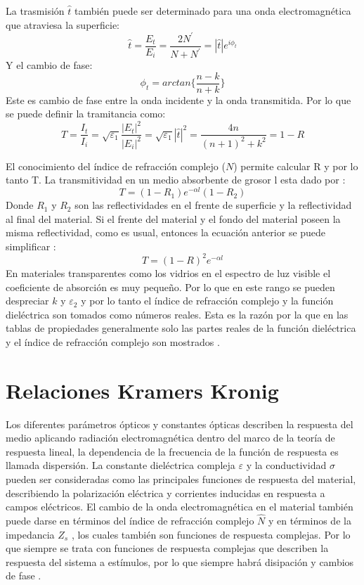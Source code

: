 \documentclass[a4paper,openright,12pt]{book}
\begin{document}
La trasmisión $\hat{t}$ también puede ser determinado para una onda electromagnética que atraviesa la  superficie:
\begin{equation}
\hat{t}=\frac{E_{t}}{E_{i}}=\frac{2N^{'}}{N+N^{'}}=|\hat{t}|e^{i\phi_{t}}
\end{equation}
Y el cambio de fase:
\begin{equation}
\phi_{t}=arctan\{\frac{n-k}{n+k}\}
\end{equation}
Este es cambio de fase entre la onda incidente y la onda transmitida. Por lo que se puede definir la tramitancia como:
\begin{equation}
T=\frac{I_{t}}{I_{i}}=\sqrt{\varepsilon_{1}}\frac{|E_{t}|^{2}}{|E_{i}|^{2}}=\sqrt{\varepsilon_{1}}|\hat{t}|^{2}=\frac{4n}{(n+1)^{2}+k^{2}}=1-R
\end{equation}


El conocimiento del índice de refracción complejo ($N$) permite calcular R y por lo tanto T. La transmitividad en un medio absorbente de grosor l esta dado por \cite{MarkFox}:
\begin{equation}
T=(1-R_{1})e^{-\alpha l}(1-R_{2})
\end{equation}
Donde $R_{1}$ y $R_{2}$ son las reflectividades en el frente de superficie y la reflectividad al final del material. Si el frente del material y el fondo del material poseen la misma reflectividad, como es usual, entonces la ecuación anterior se puede simplificar \cite{MarkFox}:
\begin{equation}
T=(1-R)^{2}e^{-\alpha l}
\end{equation}
En materiales transparentes como los vidrios en el espectro de luz visible el coeficiente de absorción es muy pequeño. Por lo que en este rango se pueden despreciar $k$ y $\varepsilon_{2}$ y por lo tanto el índice de refracción complejo y la función dieléctrica son tomados como números reales. Esta es la razón por la que en las tablas de propiedades generalmente solo las partes reales de la función dieléctrica y el índice de refracción complejo son mostrados \cite{MarkFox}.

\section{Relaciones Kramers Kronig}
Los diferentes parámetros ópticos y constantes ópticas describen la respuesta del medio aplicando radiación electromagnética dentro del marco de la teoría de respuesta lineal, la dependencia de la frecuencia de la función de respuesta es llamada dispersión. La constante dieléctrica compleja $\varepsilon$ y la conductividad $\sigma$ pueden ser consideradas como las principales funciones de respuesta del material, describiendo la polarización eléctrica y corrientes inducidas en respuesta a campos eléctricos. El cambio de la onda electromagnética en el material también puede darse en términos del índice de refracción complejo $\hat{N}$ y en términos de la impedancia $Z_{s}$ , los cuales también son funciones de respuesta complejas. Por lo que siempre se trata con funciones de respuesta complejas que describen la respuesta del sistema a estímulos, por lo que siempre habrá disipación y cambios de fase \cite{electrodynamics}. 
\end{document}
